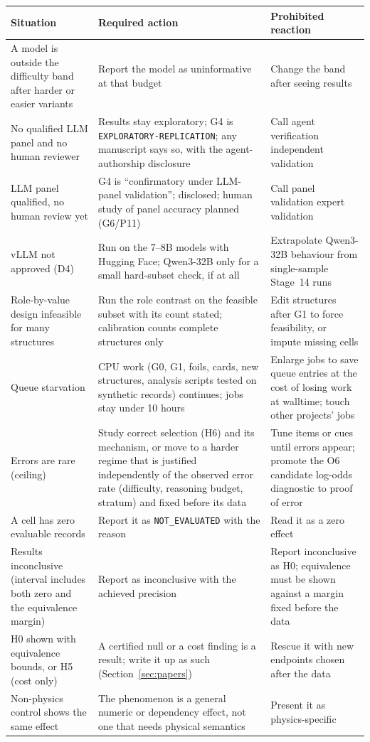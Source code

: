 \documentclass[10pt,a4paper]{article}
\newcommand{\NE}{\texttt{NOT\_EVALUATED}}
\begin{document}
{\small
\begin{longtable}{@{}P{3.6cm}P{5.4cm}P{6.0cm}@{}}
\toprule
Situation & Required action & Prohibited reaction \\
\midrule
\endhead
\bottomrule
\endfoot
A model is outside the difficulty band after harder or easier variants & Report the model as uninformative at
that budget & Change the band after seeing results \\
No qualified LLM panel and no human reviewer & Results stay exploratory; G4 is \texttt{EXPLORATORY-REPLICATION};
any manuscript says so, with the agent-authorship disclosure & Call agent verification independent validation \\
LLM panel qualified, no human review yet & G4 is ``confirmatory under LLM-panel validation''; disclosed; human study
of panel accuracy planned (G6/P11) & Call panel validation expert validation \\
vLLM not approved (D4) & Run on the 7--8B models with Hugging Face; Qwen3-32B only for a small hard-subset
check, if at all & Extrapolate Qwen3-32B behaviour from single-sample Stage~14 runs \\
Role-by-value design infeasible for many structures & Run the role contrast on the feasible subset with its
count stated; calibration counts complete structures only & Edit structures after G1 to force feasibility, or
impute missing cells \\
Queue starvation & CPU work (G0, G1, foils, cards, new structures, analysis scripts tested on synthetic records)
continues; jobs stay under 10 hours & Enlarge jobs to save queue entries at the cost of losing work at walltime;
touch other projects' jobs \\
Errors are rare (ceiling) & Study correct selection (H6) and its mechanism, or move to a harder regime that is
justified independently of the observed error rate (difficulty, reasoning budget, stratum) and fixed before its
data & Tune items or cues until errors appear; promote the O6 candidate log-odds diagnostic to proof of error \\
A cell has zero evaluable records & Report it as \NE{} with the reason & Read it as a zero effect \\
Results inconclusive (interval includes both zero and the equivalence margin) & Report as inconclusive with the
achieved precision & Report inconclusive as H0; equivalence must be shown against a margin fixed before the
data \\
H0 shown with equivalence bounds, or H5 (cost only) & A certified null or a cost finding is a result; write it up
as such (Section~\ref{sec:papers}) & Rescue it with new endpoints chosen after the data \\
Non-physics control shows the same effect & The phenomenon is a general numeric or dependency effect, not one that
needs physical semantics & Present it as physics-specific \\
\end{longtable}
}
\end{document}
